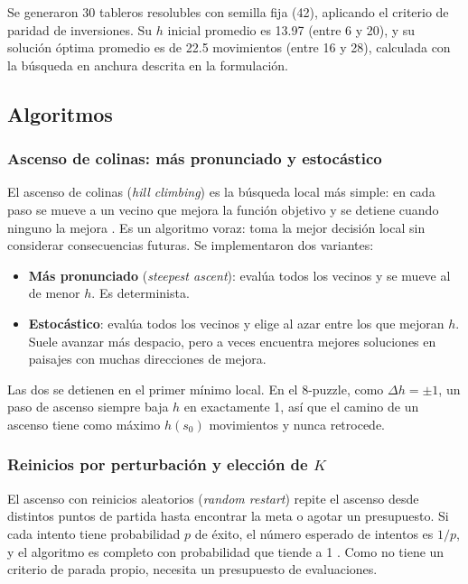 \documentclass[12pt,a4paper]{article}
\begin{document}
Se generaron 30 tableros resolubles con semilla fija (42), aplicando el
criterio de paridad de inversiones. Su $h$ inicial promedio es 13.97
(entre 6 y 20), y su solución óptima promedio es de 22.5 movimientos
(entre 16 y 28), calculada con la búsqueda en anchura descrita en la
formulación.

\subsection{Algoritmos}

\subsubsection{Ascenso de colinas: más pronunciado y estocástico}

El ascenso de colinas (\emph{hill climbing}) es la búsqueda local más
simple: en cada paso se mueve a un vecino que mejora la función
objetivo y se detiene cuando ninguno la mejora \cite{russell2021}. Es
un algoritmo voraz: toma la mejor decisión local sin considerar
consecuencias futuras. Se implementaron dos variantes:

\begin{itemize}
    \item \textbf{Más pronunciado} (\emph{steepest ascent}): evalúa
    todos los vecinos y se mueve al de menor $h$. Es determinista.
    \item \textbf{Estocástico}: evalúa todos los vecinos y elige al
    azar entre los que mejoran $h$. Suele avanzar más despacio, pero a
    veces encuentra mejores soluciones en paisajes con muchas
    direcciones de mejora.
\end{itemize}

Las dos se detienen en el primer mínimo local. En el 8-puzzle, como
$\Delta h = \pm 1$, un paso de ascenso siempre baja $h$ en exactamente
1, así que el camino de un ascenso tiene como máximo $h(s_0)$
movimientos y nunca retrocede.

\subsubsection{Reinicios por perturbación y elección de \texorpdfstring{$K$}{K}}

El ascenso con reinicios aleatorios (\emph{random restart}) repite el
ascenso desde distintos puntos de partida hasta encontrar la meta o
agotar un presupuesto. Si cada intento tiene probabilidad $p$ de
éxito, el número esperado de intentos es $1/p$, y el algoritmo es
completo con probabilidad que tiende a 1 \cite{russell2021}. Como no
tiene un criterio de parada propio, necesita un presupuesto de
evaluaciones.
\end{document}
